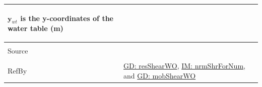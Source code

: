 \documentclass[12pt]{article}
\begin{document}
\begin{minipage}{\textwidth}
\begin{tabular}{>{\raggedright}p{}>{\raggedright\arraybackslash}p{}}
\begin{symbDescription}
                        \item{${\mathbf{y}_{wt}}$ is the y-coordinates of the water table (m)}
                        \end{symbDescription}
          \\ \midrule \\
          Source & \cite{fredlund1977}
          \\ \midrule \\
          RefBy & \hyperref[GD:resShearWO]{GD: resShearWO}, \hyperref[IM:nrmShrForNum]{IM: nrmShrForNum}, and \hyperref[GD:mobShearWO]{GD: mobShearWO}
          \\ \bottomrule
          \end{tabular}
          \end{minipage}
\par~
\end{document}
